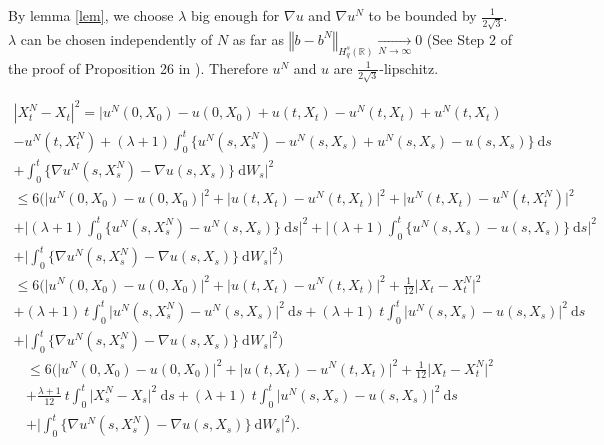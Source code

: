 \documentclass{article}[12pt]
\newcommand{\norme}[1]{\left\Vert #1\right\Vert}
\newcommand{\R}{\mathbb{R}}
\newcommand{\di}{\mathrm{d}}
\begin{document}
        By lemma \ref{lem}, we choose $\lambda$ big enough for $\nabla u$ and $\nabla u^N$ to be bounded by $\frac{1}{2\sqrt{3}}$. $\lambda$ can be chosen independently of $N$ as far as $\norme{b - b^N}_{H_q^s(\R)} \underset{N\rightarrow\infty}{\longrightarrow} 0$ (See Step 2 of the proof of Proposition 26 in \cite{Fla-Iss-Rus-2017}). Therefore $u^N$ and $u$ are $\frac{1}{2\sqrt{3}}$-lipschitz.
        
        \begin{multline*}
        \left|X^{N}_t-X_t\right|^2 = \bigg|u^N(0,X_0) - u(0,X_0) + u(t,X_t) - u^N(t,X_t)+ u^N(t,X_t)\\- u^N(t,X_t^N) + (\lambda+1)\int_0^t \{u^N(s,X_s^N)- u^N(s,X_s) + u^N(s,X_s) - u(s,X_s)\}\ \di s \\+ \int_0^t \{\nabla u^N(s,X_s^N) - \nabla u(s,X_s)\}\ \di W_s\bigg|^2
        \end{multline*}
        \begin{multline*}
        \leq 6\Bigg(\Big|u^N(0,X_0) - u(0,X_0)\Big|^2 + \Big|u(t,X_t) - u^N(t,X_t)\Big|^2 + \Big|u^N(t,X_t)- u^N(t,X_t^N)\Big|^2\\ + \bigg|(\lambda+1)\int_0^t \{u^N(s,X_s^N)- u^N(s,X_s)\}\ \di s\bigg|^2 + \bigg|(\lambda+1)\int_0^t \{u^N(s,X_s) - u(s,X_s)\}\ \di s\bigg|^2 \\+ \bigg|\int_0^t \{\nabla u^N(s,X_s^N) - \nabla u(s,X_s)\}\ \di W_s\bigg|^2 \Bigg)
        \end{multline*}
        \begin{multline*}
        \leq 6\Bigg(\Big|u^N(0,X_0) - u(0,X_0)\Big|^2 + \Big|u(t,X_t) - u^N(t,X_t)\Big|^2 + \frac{1}{12}\big|X_t- X_t^N\big|^2\\ + (\lambda+1)\ t\int_0^t \big|u^N(s,X_s^N)- u^N(s,X_s)\big|^2\ \di s + (\lambda+1)\ t\int_0^t \big|u^N(s,X_s) - u(s,X_s)\big|^2\ \di s \\+ \bigg|\int_0^t \{\nabla u^N(s,X_s^N) - \nabla u(s,X_s)\}\ \di W_s\bigg|^2 \Bigg)
        \end{multline*}
        \begin{multline*}
        \leq 6\Bigg(\Big|u^N(0,X_0) - u(0,X_0)\Big|^2 + \Big|u(t,X_t) - u^N(t,X_t)\Big|^2 + \frac{1}{12}\big|X_t- X_t^N\big|^2\\ + \frac{\lambda+1}{12}\ t\int_0^t \big|X_s^N- X_s\big|^2\ \di s + (\lambda+1)\ t\int_0^t \big|u^N(s,X_s) - u(s,X_s)\big|^2\ \di s \\+ \bigg|\int_0^t \{\nabla u^N(s,X_s^N) - \nabla u(s,X_s)\}\ \di W_s\bigg|^2 \Bigg).
        \end{multline*}
        
\end{document}
